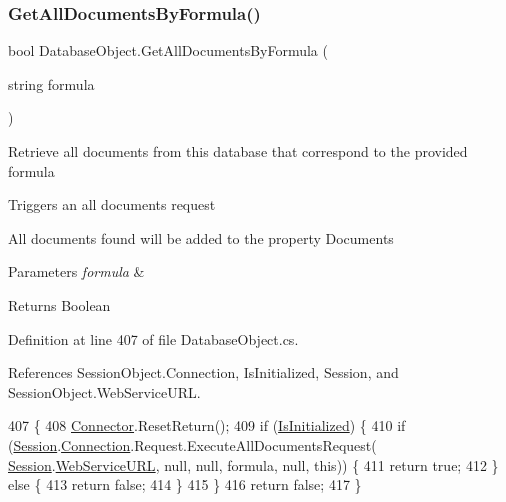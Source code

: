 \subsubsection{\texorpdfstring{Get\+All\+Documents\+By\+Formula()}{GetAllDocumentsByFormula()}}
{\footnotesize\ttfamily bool Database\+Object.\+Get\+All\+Documents\+By\+Formula (\begin{DoxyParamCaption}\item[{string}]{formula }\end{DoxyParamCaption})}



Retrieve all documents from this database that correspond to the provided formula 

Triggers an all documents request

All documents found will be added to the property \textquotesingle{}Documents\textquotesingle{}


\begin{DoxyParams}{Parameters}
{\em formula} & \\
\hline
\end{DoxyParams}
\begin{DoxyReturn}{Returns}
Boolean
\end{DoxyReturn}


Definition at line 407 of file Database\+Object.\+cs.



References Session\+Object.\+Connection, Is\+Initialized, Session, and Session\+Object.\+Web\+Service\+U\+RL.


\begin{DoxyCode}
407                                                          \{
408         \mbox{\hyperlink{class_connector}{Connector}}.ResetReturn();
409         \textcolor{keywordflow}{if} (\mbox{\hyperlink{class_database_object_a5fe036d32a30eb10d1b3f6a30263f740}{IsInitialized}}) \{
410             \textcolor{keywordflow}{if} (\mbox{\hyperlink{class_database_object_aa8484162b7d2a7c4c9426bca13c64c07}{Session}}.\mbox{\hyperlink{class_session_object_a014bdbf705a753540e19bfb53030c55c}{Connection}}.Request.ExecuteAllDocumentsRequest(
      \mbox{\hyperlink{class_database_object_aa8484162b7d2a7c4c9426bca13c64c07}{Session}}.\mbox{\hyperlink{class_session_object_a697c071c812fbf7ad1166b896fb44c16}{WebServiceURL}}, null, null, formula, null, \textcolor{keyword}{this})) \{
411                 \textcolor{keywordflow}{return} \textcolor{keyword}{true};
412             \} \textcolor{keywordflow}{else} \{
413                 \textcolor{keywordflow}{return} \textcolor{keyword}{false};
414             \}
415         \}
416         \textcolor{keywordflow}{return} \textcolor{keyword}{false};
417     \}
\end{DoxyCode}
\mbox{\label{class_database_object_ad4834e7677cd0418969a657eed99653c}} 
